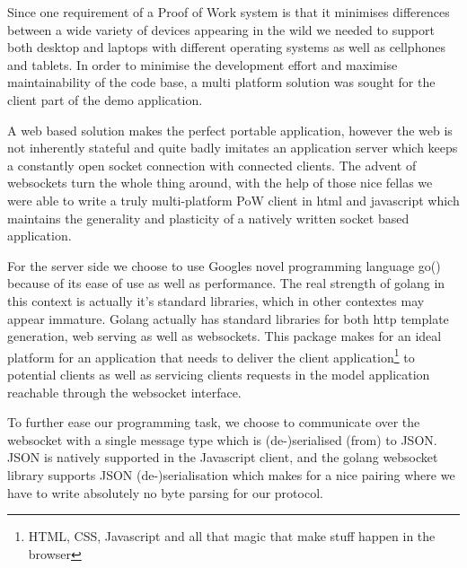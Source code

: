 Since one requirement of a Proof of Work system is that it minimises differences between a wide variety of devices appearing in the wild we needed to support both desktop and laptops with different operating systems as well as cellphones and tablets.
In order to minimise the development effort and maximise maintainability of the code base, a multi platform solution was sought for the client part of the demo application. 

A web based solution makes the perfect portable application, however the web is not inherently stateful and quite badly imitates an application server which keeps a constantly open socket connection with connected clients. The advent of websockets turn the whole thing around, with the help of those nice fellas we were able to write a truly multi-platform PoW client in html and javascript which maintains the generality and plasticity of a natively written socket based application. 

For the server side we choose to use Googles novel programming language go() because of its ease of use as well as performance. The real strength of golang in this context is actually it's standard libraries, which in other contextes may appear immature. Golang actually has standard libraries for both http template generation, web serving as well as websockets. This package makes for an ideal platform for an application that needs to deliver the client application\footnote{HTML, CSS, Javascript and all that magic that make stuff happen in the browser} to potential clients as well as servicing clients requests in the model application reachable through the websocket interface. 

To further ease our programming task, we choose to communicate over the websocket with a single message type which is (de-)serialised (from) to JSON. JSON is natively supported in the Javascript client, and the golang websocket library supports JSON (de-)serialisation which makes for a nice pairing where we have to write absolutely no byte parsing for our protocol.

